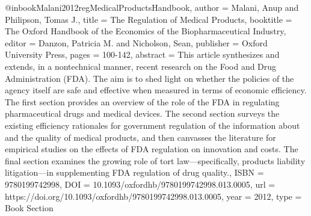 
@inbook{Malani2012regMedicalProductsHandbook,
   author = {Malani, Anup and Philipson, Tomas J.},
   title = {The Regulation of Medical Products},
   booktitle = {The Oxford Handbook of the Economics of the Biopharmaceutical Industry},
   editor = {Danzon, Patricia M. and Nicholson, Sean},
   publisher = {Oxford University Press},
   pages = {100-142},
   abstract = {This article synthesizes and extends, in a nontechnical manner, recent research on the Food and Drug Administration (FDA). The aim is to shed light on whether the policies of the agency itself are safe and effective when measured in terms of economic efficiency. The first section provides an overview of the role of the FDA in regulating pharmaceutical drugs and medical devices. The second section surveys the existing efficiency rationales for government regulation of the information about and the quality of medical products, and then canvasses the literature for empirical studies on the effects of FDA regulation on innovation and costs. The final section examines the growing role of tort law—specifically, products liability litigation—in supplementing FDA regulation of drug quality.},
   ISBN = {9780199742998},
   DOI = {10.1093/oxfordhb/9780199742998.013.0005},
   url = {https://doi.org/10.1093/oxfordhb/9780199742998.013.0005},
   year = {2012},
   type = {Book Section}
}

